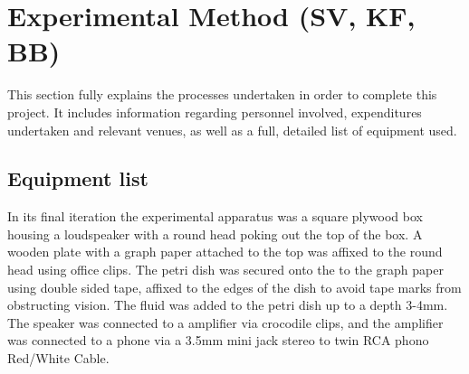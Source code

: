 \section{Experimental Method (SV, KF, BB)}

This section fully explains the processes undertaken in order to complete this project. It includes  information regarding personnel involved, expenditures undertaken and relevant venues, as well as a full, detailed list of equipment used.

\subsection{Equipment list}

In its final iteration the experimental apparatus was a square plywood box housing a loudspeaker with a round head poking out the top of the box. A wooden plate with a graph paper attached to the top was affixed to the round head using office clips. The petri dish was secured onto the to the graph paper using double sided tape, affixed to the edges of the dish to avoid tape marks from obstructing vision. The fluid was added to the petri dish up to a depth 3-4mm. The speaker was connected to a amplifier via crocodile clips, and the amplifier was connected to a phone via a 3.5mm mini jack stereo to twin RCA phono Red/White Cable.  

